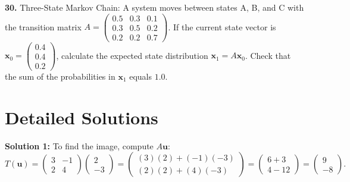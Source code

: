 \documentclass{article}
\begin{document}
\vspace{0.3cm}
\textbf{30.} Three-State Markov Chain: A system moves between states A, B, and C with the transition matrix $A = \begin{pmatrix} 0.5 & 0.3 & 0.1 \\ 0.3 & 0.5 & 0.2 \\ 0.2 & 0.2 & 0.7 \end{pmatrix}$. If the current state vector is $\mathbf{x}_0 = \begin{pmatrix} 0.4 \\ 0.4 \\ 0.2 \end{pmatrix}$, calculate the expected state distribution $\mathbf{x}_1 = A\mathbf{x}_0$. Check that the sum of the probabilities in $\mathbf{x}_1$ equals $1.0$.

\newpage

\section{Detailed Solutions}

\textbf{Solution 1:}
To find the image, compute $A\mathbf{u}$:
$$T(\mathbf{u}) = \begin{pmatrix} 3 & -1 \\ 2 & 4 \end{pmatrix} \begin{pmatrix} 2 \\ -3 \end{pmatrix} = \begin{pmatrix} (3)(2) + (-1)(-3) \\ (2)(2) + (4)(-3) \end{pmatrix} = \begin{pmatrix} 6 + 3 \\ 4 - 12 \end{pmatrix} = \begin{pmatrix} 9 \\ -8 \end{pmatrix}.$$
\end{document}
